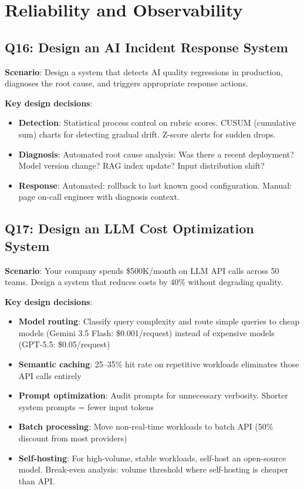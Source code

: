 \section{Reliability and Observability}

\subsection{Q16: Design an AI Incident Response System}

\textbf{Scenario}: Design a system that detects AI quality regressions in production, diagnoses the root cause, and triggers appropriate response actions.

\textbf{Key design decisions}:
\begin{itemize}[leftmargin=*]
    \item \textbf{Detection}: Statistical process control on rubric scores. CUSUM (cumulative sum) charts for detecting gradual drift. Z-score alerts for sudden drops.
    \item \textbf{Diagnosis}: Automated root cause analysis: Was there a recent deployment? Model version change? RAG index update? Input distribution shift?
    \item \textbf{Response}: Automated: rollback to last known good configuration. Manual: page on-call engineer with diagnosis context.
\end{itemize}

\subsection{Q17: Design an LLM Cost Optimization System}

\textbf{Scenario}: Your company spends \$500K/month on LLM API calls across 50 teams. Design a system that reduces costs by 40\% without degrading quality.

\textbf{Key design decisions}:
\begin{itemize}[leftmargin=*]
    \item \textbf{Model routing}: Classify query complexity and route simple queries to cheap models (Gemini 3.5 Flash: \$0.001/request) instead of expensive models (GPT-5.5: \$0.05/request)
    \item \textbf{Semantic caching}: 25--35\% hit rate on repetitive workloads eliminates those API calls entirely
    \item \textbf{Prompt optimization}: Audit prompts for unnecessary verbosity. Shorter system prompts = fewer input tokens
    \item \textbf{Batch processing}: Move non-real-time workloads to batch API (50\% discount from most providers)
    \item \textbf{Self-hosting}: For high-volume, stable workloads, self-host an open-source model. Break-even analysis: volume threshold where self-hosting is cheaper than API.
\end{itemize}


